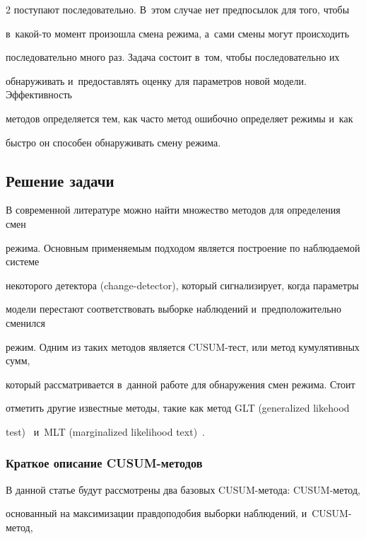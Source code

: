 \begin{multicols}{2}
поступают последовательно. В~этом случае нет предпосылок для того, чтобы 


в~ка\-кой-то момент произошла смена режима, а~сами смены могут происходить 


последовательно много раз. Задача состоит в~том, чтобы последовательно их 


обнаруживать и~предоставлять оценку для параметров новой модели. Эффективность 


методов определяется тем, как часто метод ошибочно определяет режимы и~как 


быстро он способен обнаруживать смену режима.





\subsection{Решение задачи}





В современной литературе можно найти множество методов  для определения смен 


режима. Основным применяемым подходом является по\-стро\-ение по наблюдаемой системе  


некоторого детектора (change-detector), который сигнализирует, когда параметры 


модели перестают соответствовать выборке наблюдений и~предположительно сменился 


режим. Одним из таких методов  является CUSUM-тест, или метод кумулятивных сумм, 


который рассматривается в~данной работе для обнаружения смен режима. Стоит 


отметить другие известные методы, такие как метод GLT (generalized likehood 


test)~\cite{appel} и~MLT (marginalized likelihood text)~\cite{gustafsson}.





\subsubsection{Краткое описание CUSUM-методов}





В данной статье будут рассмотрены два базовых CUSUM-ме\-то\-да: CUSUM-ме\-тод, 


основанный на максимизации правдоподобия выборки наблюдений, и~CUSUM-ме\-тод, 



\end{multicols}
